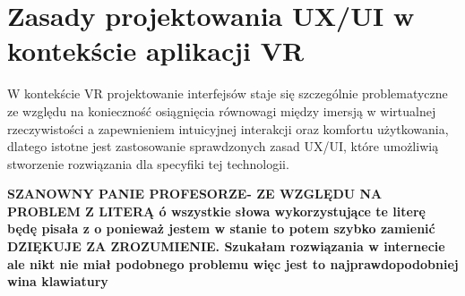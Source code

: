 \section{Zasady  projektowania UX/UI w kontekście aplikacji VR}


W kontekście VR projektowanie interfejsów staje się szczególnie problematyczne ze względu na konieczność osiągnięcia równowagi między imersją w wirtualnej rzeczywistości a zapewnieniem intuicyjnej interakcji oraz komfortu użytkowania, dlatego istotne jest zastosowanie sprawdzonych zasad UX/UI, które umożliwią stworzenie rozwiązania dla specyfiki tej technologii.



\textbf{
SZANOWNY PANIE PROFESORZE- ZE WZGLĘDU NA PROBLEM Z LITERĄ ó wszystkie słowa wykorzystujące te literę będę pisała z o ponieważ jestem w stanie to potem szybko zamienić 
DZIĘKUJE ZA ZROZUMIENIE. 
Szukałam rozwiązania w internecie ale nikt nie miał podobnego problemu więc jest to najprawdopodobniej wina klawiatury}